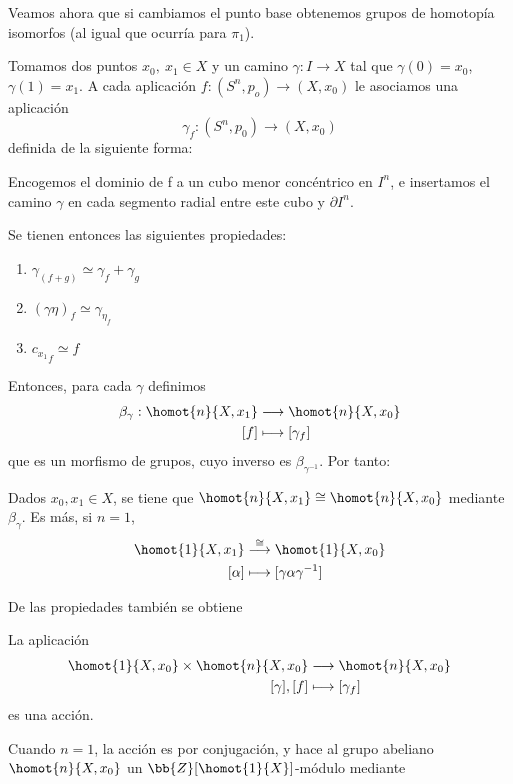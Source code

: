 Veamos ahora que si cambiamos el punto base obtenemos grupos de homotopía isomorfos (al igual que ocurría para $\pi_1$). \par
Tomamos dos puntos $x_0, \ x_1 \in X$ y un camino $\gamma : I \longrightarrow X$ tal que $\gamma(0) = x_0$, $\gamma(1) = x_1$. A cada aplicación $f : (S^n, p_o) \longrightarrow (X, x_0)$ le asociamos una aplicación
\[
\gamma_f : (S^n, p_0) \longrightarrow (X, x_0)
\]
definida de la siguiente forma: \par
Encogemos el dominio de f a un cubo menor concéntrico en $I^n$, e insertamos el camino $\gamma$ en cada segmento radial entre este cubo y $\partial I^n$.  \par
Se tienen entonces las siguientes propiedades: \par
\begin{enumerate}
\item $\gamma_{(f+g)} \simeq \gamma_f + \gamma_g$
\item $(\gamma \eta)_f \simeq \gamma_{\eta_f}$
\item ${c_{x_1}}_f \simeq f$
\end{enumerate}
Entonces, para cada $\gamma$ definimos
\begin{align*}
\beta_\gamma : \homot{n}{X, x_1} &\longrightarrow \homot{n}{X, x_0} \\
[f] &\longmapsto [\gamma_f]
\end{align*}
que es un morfismo de grupos, cuyo inverso es $\beta_{\gamma^{-1}}$. Por tanto:
\begin{teor}
Dados $x_0, x_1 \in X$, se tiene que $\homot{n}{X, x_1} \cong \homot{n}{X, x_0}$ mediante $\beta_\gamma$.
Es más, si $n=1$,
\begin{align*}
\homot{1}{X, x_1} &\stackrel{\cong}{\longrightarrow} \homot{1}{X, x_0} \\
[\alpha] &\longmapsto [\gamma \alpha \gamma^{-1}]
\end{align*}
\end{teor}
De las propiedades también se obtiene
\begin{teor}
La aplicación 
\begin{align*}
\homot{1}{X, x_0} \times \homot{n}{X, x_0} &\longrightarrow \homot{n}{X, x_0} \\
[\gamma], [f] &\longmapsto [\gamma_f]
\end{align*}
es una acción.
\end{teor}
Cuando $n = 1$, la acción es por conjugación, y hace al grupo abeliano $\homot{n}{X, x_0}$ un $\bb{Z}[\homot{1}{X}]$-módulo mediante
